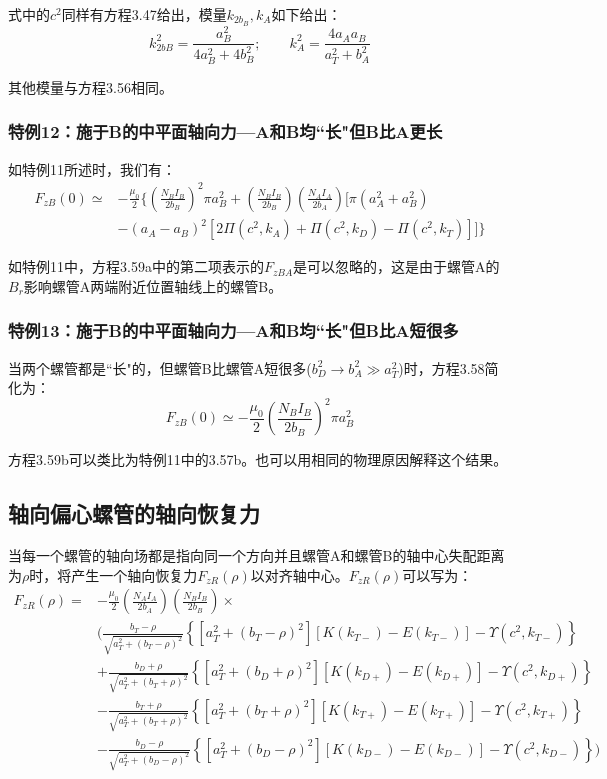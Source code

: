 式中的$c^2$同样有方程3.47给出，模量$k_{2b_B},k_A$如下给出：
\begin{equation*}
k_{2bB}^2=\frac{a_B^2}{4a_B^2+4b_B^2};\quad \quad k_A^2=\frac{4a_Aa_B}{a_T^2+b_A^2}
\end{equation*}

其他模量与方程3.56相同。

\subsubsection{特例12：施于B的中平面轴向力---A和B均``长"但B比A更长}
如特例11所述时，我们有：
\begin{equation}
\begin{split}
F_{zB}(0)\simeq&-\frac{\mu_0}{2}\big\{(\frac{N_BI_B}{2b_B})^2\pi a_B^2+(\frac {N_BI_B}{2b_B})(\frac{N_AI_A}{2b_A})[\pi(a_A^2+a_B^2)\\
&-(a_A-a_B)^2[2\Pi(c^2,k_A)+\Pi(c^2,k_D)-\Pi(c^2,k_T)]]\big\}
\end{split}
\end{equation}

如特例11中，方程3.59a中的第二项表示的$F_{zBA}$是可以忽略的，这是由于螺管A的$B_r$影响螺管A两端附近位置轴线上的螺管B。

\subsubsection{特例13：施于B的中平面轴向力---A和B均``长"但B比A短很多}
当两个螺管都是``长"的，但螺管B比螺管A短很多($b_D^2\rightarrow b_A^2\gg a_T^2$)时，方程3.58简化为：
\begin{equation*}
F_{zB}(0)\simeq-\frac{\mu_0}{2}\left(\frac{N_BI_B}{2b_B}\right)^2\pi a_B^2 \tag{3.59'}
\end{equation*}

方程3.59b可以类比为特例11中的3.57b。也可以用相同的物理原因解释这个结果。

\subsection{轴向偏心螺管的轴向恢复力}
当每一个螺管的轴向场都是指向同一个方向并且螺管A和螺管B的轴中心失配距离为$\rho$时，将产生一个轴向恢复力$F_{zR}(\rho)$以对齐轴中心。$F_{zR}(\rho)$可以写为：
\begin{equation}
\begin{split}
F_{zR}(\rho)=&-\frac{\mu_0}{2}(\frac{N_AI_A}{2b_A})(\frac{N_BI_B}{2b_B})\times\\
&(\frac{b_T-\rho}{\sqrt{a_T^2+(b_T-\rho)^2}}\left\{[a_T^2+(b_T-\rho)^2][K(k_{T-})-E(k_{T-})]-\Upsilon(c^2,k_{T-})\right\}\\
&+\frac{b_D+\rho}{\sqrt{a_T^2+(b_T+\rho)^2}}\left\{[a_T^2+(b_D+\rho)^2][K(k_{D+})-E(k_{D+})]-\Upsilon(c^2,k_{D+})\right\}\\
&-\frac{b_T+\rho}{\sqrt{a_T^2+(b_T+\rho)^2}}\left\{[a_T^2+(b_T+\rho)^2][K(k_{T+})-E(k_{T+})]-\Upsilon(c^2,k_{T+})\right\}\\
&-\frac{b_D-\rho}{\sqrt{a_T^2+(b_D-\rho)^2}}\left\{[a_T^2+(b_D-\rho)^2][K(k_{D-})-E(k_{D-})]-\Upsilon(c^2,k_{D-})\right\})
\end{split}
\end{equation}

